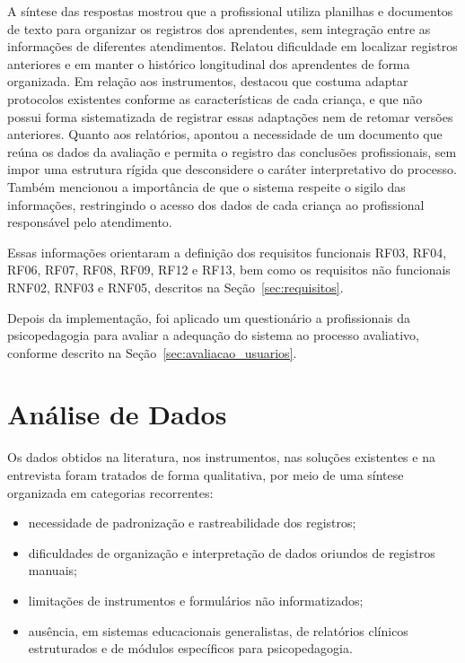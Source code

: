 A síntese das respostas mostrou que a profissional utiliza planilhas e documentos de texto para organizar os registros dos aprendentes, sem integração entre as informações de diferentes atendimentos. Relatou dificuldade em localizar registros anteriores e em manter o histórico longitudinal dos aprendentes de forma organizada. Em relação aos instrumentos, destacou que costuma adaptar protocolos existentes conforme as características de cada criança, e que não possui forma sistematizada de registrar essas adaptações nem de retomar versões anteriores. Quanto aos relatórios, apontou a necessidade de um documento que reúna os dados da avaliação e permita o registro das conclusões profissionais, sem impor uma estrutura rígida que desconsidere o caráter interpretativo do processo. Também mencionou a importância de que o sistema respeite o sigilo das informações, restringindo o acesso dos dados de cada criança ao profissional responsável pelo atendimento.

Essas informações orientaram a definição dos requisitos funcionais RF03, RF04, RF06, RF07, RF08, RF09, RF12 e RF13, bem como os requisitos não funcionais RNF02, RNF03 e RNF05, descritos na Seção~\ref{sec:requisitos}.

Depois da implementação, foi aplicado um questionário a profissionais da psicopedagogia para avaliar a adequação do sistema ao processo avaliativo, conforme descrito na Seção~\ref{sec:avaliacao_usuarios}.

\section{Análise de Dados}

Os dados obtidos na literatura, nos instrumentos, nas soluções existentes e na entrevista foram tratados de forma qualitativa, por meio de uma síntese organizada em categorias recorrentes:

\begin{itemize}
    \item necessidade de padronização e rastreabilidade dos registros;
    \item dificuldades de organização e interpretação de dados oriundos de registros manuais;
    \item limitações de instrumentos e formulários não informatizados;
    \item ausência, em sistemas educacionais generalistas, de relatórios clínicos estruturados e de módulos específicos para psicopedagogia.
\end{itemize}

